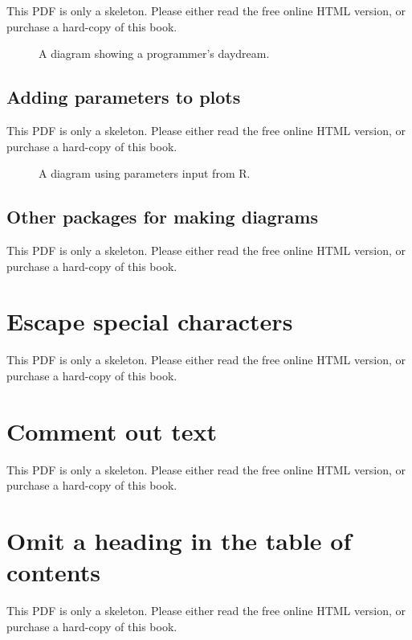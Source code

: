 \documentclass[
  11pt,
]{krantz}
\begin{document}
This PDF is only a skeleton. Please either read the free online HTML version, or purchase a hard-copy of this book.

\begin{figure}\caption{A diagram showing a programmer's daydream.}\end{figure}

\subsection{Adding parameters to plots}\label{adding-parameters-to-plots}

This PDF is only a skeleton. Please either read the free online HTML version, or purchase a hard-copy of this book.

\begin{figure}\caption{A diagram using parameters input from R.}\end{figure}

\subsection{Other packages for making diagrams}\label{other-packages-for-making-diagrams}

This PDF is only a skeleton. Please either read the free online HTML version, or purchase a hard-copy of this book.

\section{Escape special characters}\label{special-chars}

This PDF is only a skeleton. Please either read the free online HTML version, or purchase a hard-copy of this book.

\section{Comment out text}\label{comments}

This PDF is only a skeleton. Please either read the free online HTML version, or purchase a hard-copy of this book.

\section{Omit a heading in the table of contents}\label{toc-unlisted}

This PDF is only a skeleton. Please either read the free online HTML version, or purchase a hard-copy of this book.
\end{document}
